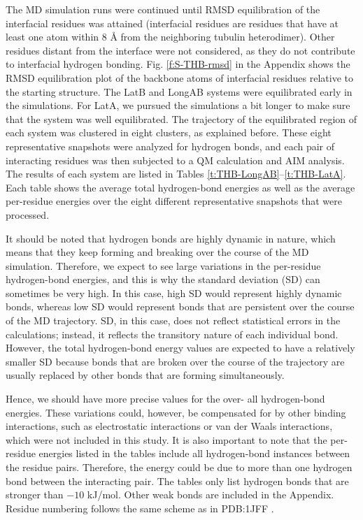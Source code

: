 \documentclass[11pt]{report}
\begin{document}
The MD simulation runs were continued until RMSD equilibration of the interfacial residues was attained (interfacial residues are residues that have at least one atom within 8 \r{A} from the neighboring tubulin heterodimer). Other residues distant from the interface were not considered, as they do not contribute to interfacial hydrogen bonding. 
Fig. \ref{f:S-THB-rmsd} in the Appendix shows the RMSD equilibration plot of the backbone atoms of interfacial residues relative to the starting structure. The LatB and LongAB systems were equilibrated early in the simulations. For LatA, we pursued the simulations a bit longer to make sure that the system was well equilibrated. The trajectory of the equilibrated region of each system was clustered in eight clusters, as explained before. These eight representative snapshots were analyzed for hydrogen bonds, and each pair of interacting residues was then subjected to a QM calculation and AIM analysis. The results of each system are listed in 
Tables \ref{t:THB-LongAB}--\ref{t:THB-LatA}.
Each table shows the average total hydrogen-bond energies as well as the average per-residue energies over the eight different representative snapshots that were processed.

It should be noted that hydrogen bonds are highly dynamic in nature, which means that they keep forming and breaking over the course of the MD simulation. Therefore, we expect to see large variations in the per-residue hydrogen-bond energies, and this is why the standard deviation (SD) can sometimes be very high. In this case, high SD would represent highly dynamic bonds, whereas low SD would represent bonds that are persistent over the course of the MD trajectory. SD, in this case, does not reflect statistical errors in the calculations; instead, it reflects the transitory nature of each individual bond. However, the total hydrogen-bond energy values are expected to have a relatively smaller SD because bonds that are broken over the course of the trajectory are usually replaced by other bonds that are forming simultaneously.


Hence, we should have more precise values for the over-
all hydrogen-bond energies. These variations could, however, be compensated for by other binding interactions, such as electrostatic interactions or van der Waals interactions, which were not included in this study. It is also important to note that the per-residue energies listed in the tables include all hydrogen-bond instances between the residue pairs. Therefore, the energy could be due to more than one hydrogen bond between the interacting pair.
The tables
only list hydrogen bonds that are stronger than $-10$ kJ/mol. Other weak bonds are included in the Appendix. Residue numbering follows the same scheme as in PDB:1JFF
\cite{Lowe2001}.
\end{document}
